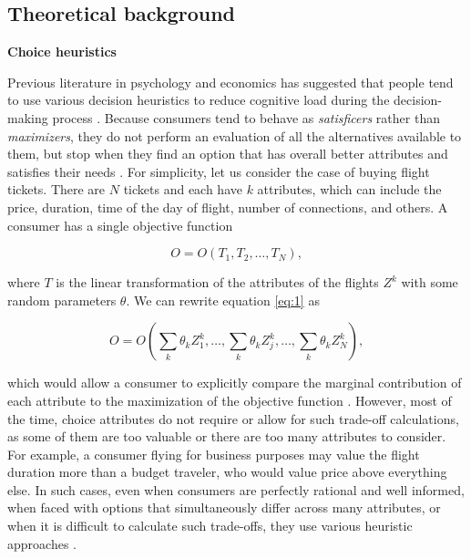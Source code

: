 \documentclass[a4paper,12pt]{article}
\begin{document}
\subsection{Theoretical background}

\textbf{Choice heuristics}

Previous literature in psychology and economics has suggested that people tend to use various decision heuristics to reduce cognitive load during the decision-making process \citep{fishburn74,bettman1979memory,johnson1989choice}. Because consumers tend to behave as \textit{satisficers} rather than \textit{maximizers}, they do not perform an evaluation of all the alternatives available to them, but stop when they find an option that has overall better attributes and satisfies their needs \citep{simon1956rational}. For simplicity, let us consider the case of buying flight tickets. There are $N$ tickets and each have $k$ attributes, which can include the price, duration, time of the day of flight, number of connections, and others. A consumer has a single objective function

\begin{equation} \label{eq:1}
   O = O(T_1, T_2, \dots, T_N), 
\end{equation}

where $T$ is the linear transformation of the attributes of the flights $Z^k$ with some random parameters $\theta$. We can rewrite equation \ref{eq:1} as

    \begin{equation} \label{eq:2}
        O = O\left(\sum_{k} \theta_{k}Z_1^k, \dots,\sum_{k} \theta_{k}Z_j^k, \dots, \sum_{k} \theta_{k}Z_N^k\right),
    \end{equation}

which would allow a consumer to explicitly compare the marginal contribution of each attribute to the maximization of the objective function \citep{de2011modelling}. However, most of the time, choice attributes do not require or allow for such trade-off calculations, as some of them are too valuable or there are too many attributes to consider. For example, a consumer flying for business purposes may value the flight duration more than a budget traveler, who would value price above everything else. In such cases, even when consumers are perfectly rational and well informed, when faced with options that simultaneously differ across many attributes, or when it is difficult to calculate such trade-offs, they use various heuristic approaches \citep{hauser1990evaluation}.
\end{document}
